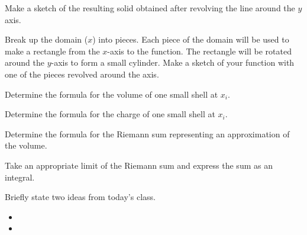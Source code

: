 \begin{problem}
\begin{subproblem}
         \item Make a sketch of the resulting solid obtained after
           revolving the line around the $y$ axis.
           \vfill

         \item Break up the domain ($x$) into pieces. Each piece of the domain will be used to make a rectangle
              from the $x$-axis to the function. The rectangle will be rotated around the $y$-axis to form a small cylinder.
              Make a sketch of your function with one of the pieces revolved around the axis.
           \vfill

         \clearpage

         \item Determine the formula for the volume of one small shell at $x_i$.
           \vfill

         \item Determine the formula for the charge of one small shell at $x_i$.
           \vfill

         \item Determine the formula for the Riemann sum representing an approximation of the volume.
           \vfill

         \item Take an appropriate limit of the Riemann sum and express the sum as an integral.
           \vfill

       \end{subproblem}
\end{problem}

\postClass

\begin{problem}
\item Briefly state two ideas from today's class.
  \begin{itemize}
  \item
  \item
  \end{itemize}
\item
  \begin{subproblem}
    \item
  \end{subproblem}
\end{problem}




